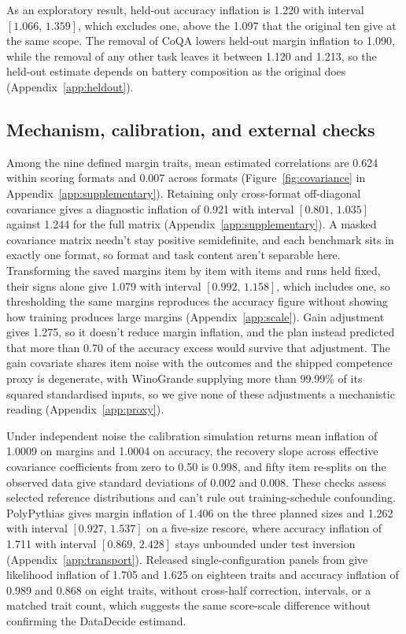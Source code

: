 \documentclass{article}
\newcommand{\ci}[2]{\ensuremath{[#1,\,#2]}}
\begin{document}
As an exploratory result, held-out accuracy inflation is 1.220 with interval \ci{1.066}{1.359}, which excludes one, above the 1.097 that the original ten give at the same scope. The removal of CoQA lowers held-out margin inflation to 1.090, while the removal of any other task leaves it between 1.120 and 1.213, so the held-out estimate depends on battery composition as the original does (Appendix~\ref{app:heldout}).

\subsection{Mechanism, calibration, and external checks}
Among the nine defined margin traits, mean estimated correlations are 0.624 within scoring formats and 0.007 across formats (Figure~\ref{fig:covariance} in Appendix~\ref{app:supplementary}). Retaining only cross-format off-diagonal covariance gives a diagnostic inflation of 0.921 with interval \ci{0.801}{1.035} against 1.244 for the full matrix (Appendix~\ref{app:supplementary}). A masked covariance matrix needn't stay positive semidefinite, and each benchmark sits in exactly one format, so format and task content aren't separable here. Transforming the saved margins item by item with items and runs held fixed, their signs alone give 1.079 with interval \ci{0.992}{1.158}, which includes one, so thresholding the same margins reproduces the accuracy figure without showing how training produces large margins (Appendix~\ref{app:scale}). Gain adjustment gives 1.275, so it doesn't reduce margin inflation, and the plan instead predicted that more than 0.70 of the accuracy excess would survive that adjustment. The gain covariate shares item noise with the outcomes and the shipped competence proxy is degenerate, with WinoGrande supplying more than 99.99\% of its squared standardised inputs, so we give none of these adjustments a mechanistic reading (Appendix~\ref{app:proxy}).

Under independent noise the calibration simulation returns mean inflation of 1.0009 on margins and 1.0004 on accuracy, the recovery slope across effective covariance coefficients from zero to 0.50 is 0.998, and fifty item re-splits on the observed data give standard deviations of 0.002 and 0.008. These checks assess selected reference distributions and can't rule out training-schedule confounding. PolyPythias gives margin inflation of 1.406 on the three planned sizes and 1.262 with interval \ci{0.927}{1.537} on a five-size rescore, where accuracy inflation of 1.711 with interval \ci{0.869}{2.428} stays unbounded under test inversion (Appendix~\ref{app:transport}). Released single-configuration panels from \citet{heineman2025} give likelihood inflation of 1.705 and 1.625 on eighteen traits and accuracy inflation of 0.989 and 0.868 on eight traits, without cross-half correction, intervals, or a matched trait count, which suggests the same score-scale difference without confirming the DataDecide estimand.
\end{document}
